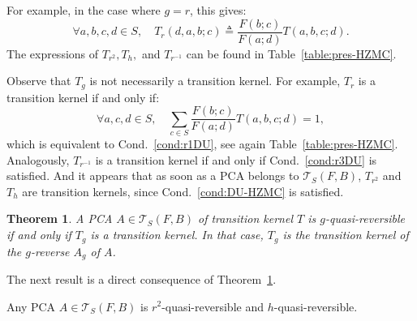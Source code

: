 \documentclass[10pt]{amsart}
\newtheorem{theo}{Theorem}[section]
\theoremstyle{definition}\newtheorem{defi}[theo]{Definition}\newtheorem{rema}[theo]{Remark}\newtheorem{exam}[theo]{Example}\newtheorem{exem}[theo]{Example}\newtheorem{nota}[theo]{Notation}
\newcounter{a}
\newcommand{\Cond}{Cond.}
\newcommand{\triang}[2]{\mathcal{T}_{#1} \left(#2 \right)}
\newcommand{\isdef}{\triangleq}
\let\oldforall\forall
\renewcommand*{\forall}{\mathrel{\oldforall}}
\begin{document}
For example, in the case where $g=r$, this gives:
\begin{equation}\label{eq:rrevtm}
\forall a,b,c,d\in S, \quad T_r(d,a,b;c)\isdef \frac{F(b;c)}{F(a;d)} T(a,b,c;d).
\end{equation}
The expressions of $T_{r^2}, T_{h},$ and $T_{r^{-1}}$ can be found in Table~\ref{table:pres-HZMC}.

Observe that $T_g$ is not necessarily a transition kernel. For example, $T_r$ is a transition kernel if and only if:
\[
\forall a,c,d \in S, \quad \sum_{c\in S} \frac{F(b;c)}{F(a;d)} T(a,b,c;d)=1,
\]
which is equivalent to \Cond~\ref{cond:r1DU}, see again Table~\ref{table:pres-HZMC}. Analogously, $T_{r^{-1}}$ is a transition kernel if and only if \Cond~\ref{cond:r3DU} is satisfied. And it appears that as soon as a PCA belongs to $\triang{S}{F,B}$, $T_{r^2}$ and $T_h$ are transition kernels, since \Cond~\ref{cond:DU-HZMC} is satisfied.

\begin{theo}\label{theo:refereeHZMC}
A PCA $A \in \triang{S}{F,B}$ of transition kernel $T$ is $g$-quasi-reversible if and only if $T_g$ is a transition kernel. In that case, $T_g$ is the transition kernel of the $g$-reverse $A_g$ of $A$.
\end{theo}

The next result is a direct consequence of Theorem~\ref{theo:refereeHZMC}.

\begin{coro}\label{cor:reversibilityHZMC}
Any PCA $A \in \triang{S}{F,B}$ is $r^2$-quasi-reversible and $h$-quasi-reversible.
\end{coro}
\end{document}
